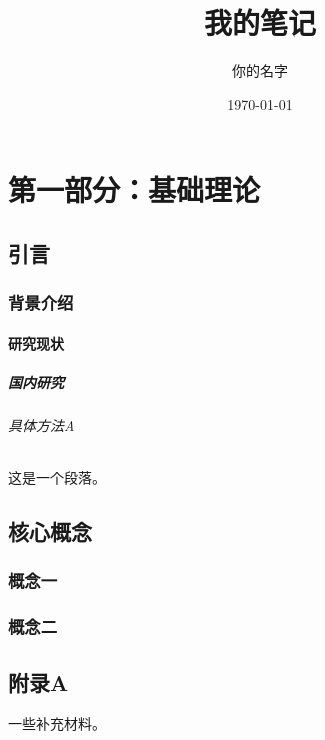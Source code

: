 \documentclass[a4paper,12pt,twoside]{ctexbook}
\title{我的笔记} %
\author{你的名字}   %
\date{\today}       %
\begin{document}
\maketitle %
\thispagestyle{empty} %

\clearpage
{} %
\tableofcontents %

\clearpage
{} %
\setcounter{page}{1}  %


\part{第一部分：基础理论}

\chapter{引言}
\lipsum[1-2] %

\section{背景介绍}
\lipsum[3]

\subsection{研究现状}
\lipsum[4]

\subsubsection{国内研究}
\lipsum[5]

\paragraph{具体方法A} 这是一个段落。
\lipsum[6]

\chapter{核心概念}
\lipsum[7-9]

\section{概念一}
\lipsum[10]

\section{概念二}
\lipsum[11]

\appendix %
\chapter{附录A}
一些补充材料。

\end{document}
